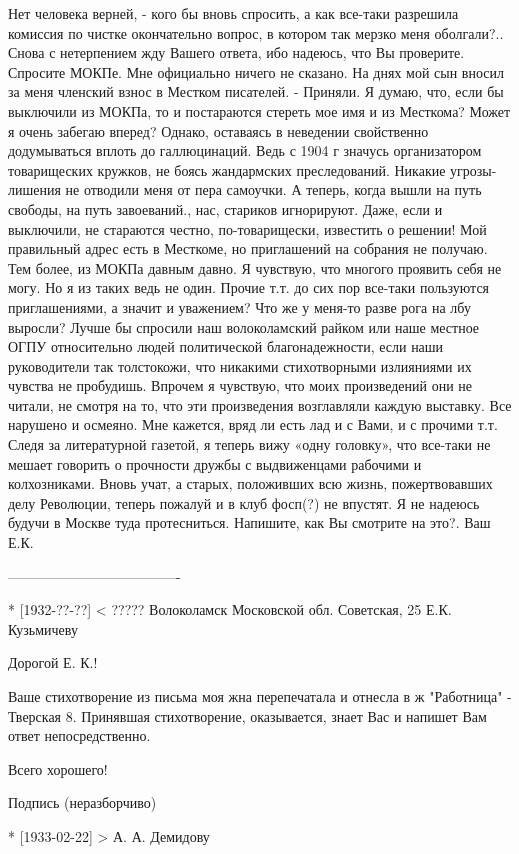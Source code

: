 \documentclass[]{memoir}
\begin{document}
Нет человека верней, - кого бы вновь спросить, а как все-таки разрешила комиссия по чистке окончательно вопрос, в котором так мерзко меня оболгали?.. Снова с нетерпением жду Вашего ответа, ибо надеюсь, что Вы проверите. Спросите МОКПе. Мне официально ничего не сказано. На днях мой сын вносил за меня членский взнос в Местком писателей. - Приняли.
Я думаю, что, если бы выключили из МОКПа, то и постараются стереть мое имя и из Месткома? Может я очень забегаю вперед? Однако, оставаясь в неведении свойственно додумываться вплоть до галлюцинаций. Ведь с 1904 г значусь организатором товарищеских кружков, не боясь жандармских преследований. Никакие угрозы-лишения не отводили меня от пера самоучки. А теперь, когда вышли на путь свободы, на путь завоеваний., нас, стариков игнорируют. Даже, если и выключили, не стараются честно, по-товарищески, известить о решении!
Мой правильный адрес есть в Месткоме, но приглашений на собрания не получаю. Тем более, из МОКПа давным давно. Я чувствую, что многого проявить себя не могу. Но я из таких ведь не один. Прочие т.т. до сих пор все-таки пользуются приглашениями, а значит и уважением? Что же у меня-то разве рога на лбу выросли? Лучше бы спросили наш волоколамский райком или наше местное ОГПУ относительно людей политической благонадежности, если наши руководители так толстокожи, что никакими стихотворными излияниями их чувства не пробудишь. Впрочем я чувствую, что моих произведений они не читали, не смотря на то, что эти произведения возглавляли каждую выставку. Все нарушено и осмеяно. Мне кажется, вряд ли есть лад и с Вами, и с прочими т.т. Следя за литературной газетой, я теперь вижу «одну головку», что все-таки не мешает говорить о прочности дружбы с выдвиженцами рабочими и колхозниками. Вновь учат, а старых, положивших всю жизнь,  пожертвовавших делу Революции, теперь пожалуй и в клуб фосп(?) не впустят. Я не надеюсь будучи в Москве туда протесниться. Напишите, как Вы смотрите на это?. Ваш Е.К.


-------------------------------------

* [1932-??-??] < ?????
Волоколамск Московской обл. Советская, 25
Е.К. Кузьмичеву

Дорогой Е. К.!

Ваше стихотворение из письма моя жна перепечатала и отнесла в ж "Работница" - Тверская 8.
Принявшая стихотворение, оказывается, знает Вас и напишет Вам ответ непосредственно.

Всего хорошего!

Подпись (неразборчиво)

* [1933-02-22] > А. А. Демидову 
\end{document}
